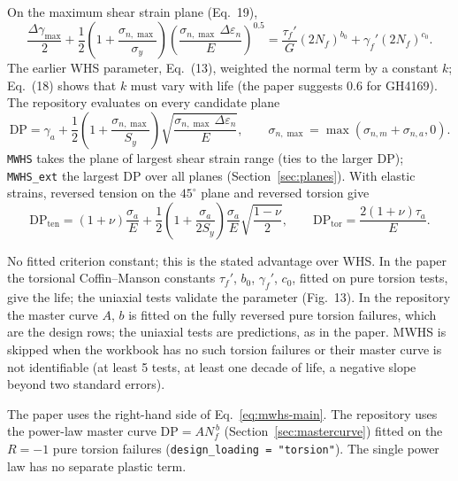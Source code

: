  On the maximum shear strain plane (Eq.~19),
\begin{equation}
\frac{\Delta\gamma_{\max}}{2}+\frac12\left(1+\frac{\sigma_{n,\max}}{\sigma_y}\right)
\left(\frac{\sigma_{n,\max}\,\Delta\varepsilon_n}{E}\right)^{0.5}
=\frac{\tau_f'}{G}(2N_f)^{b_0}+\gamma_f'(2N_f)^{c_0} .
\label{eq:mwhs-main}
\end{equation}
The earlier WHS parameter, Eq.~(13), weighted the normal term by a constant $k$; Eq.~(18) shows that
$k$ must vary with life (the paper suggests 0.6 for GH4169). The repository evaluates on every
candidate plane
\begin{equation}
\mathrm{DP}=\gamma_a+\frac12\left(1+\frac{\sigma_{n,\max}}{S_y}\right)\sqrt{\frac{\sigma_{n,\max}\,\Delta\varepsilon_n}{E}},
\qquad \sigma_{n,\max}=\max(\sigma_{n,m}+\sigma_{n,a},0).
\label{eq:mwhs-dp}
\end{equation}
\texttt{MWHS} takes the plane of largest shear strain range (ties to the larger DP);
\texttt{MWHS\_ext} the largest DP over all planes (Section~\ref{sec:planes}). With elastic strains,
reversed tension on the $45^\circ$ plane and reversed torsion give
\begin{equation}
\mathrm{DP}_\text{ten}=(1+\nu)\frac{\sigma_a}{E}+\frac12\left(1+\frac{\sigma_a}{2S_y}\right)\frac{\sigma_a}{E}\sqrt{\frac{1-\nu}{2}},\qquad
\mathrm{DP}_\text{tor}=\frac{2(1+\nu)\tau_a}{E} .
\label{eq:mwhs-limits}
\end{equation}

 No fitted criterion constant; this is the stated advantage over
WHS. In the paper the torsional Coffin--Manson constants $\tau_f'$, $b_0$, $\gamma_f'$, $c_0$, fitted
on pure torsion tests, give the life; the uniaxial tests validate the parameter (Fig.~13). In the
repository the master curve $A$, $b$ is fitted on the fully reversed pure torsion failures, which
are the design rows; the uniaxial tests are predictions, as in the paper. MWHS is skipped when the
workbook has no such torsion failures or their master curve is not identifiable (at least 5 tests,
at least one decade of life, a negative slope beyond two standard errors).

 The paper uses the right-hand side of Eq.~\eqref{eq:mwhs-main}. The repository uses the
power-law master curve $\mathrm{DP}=A N_f^{\,b}$ (Section~\ref{sec:mastercurve}) fitted on the $R=-1$
pure torsion failures (\texttt{design\_loading = "torsion"}). The single power law has no separate
plastic term.

